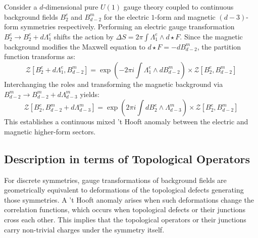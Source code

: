 \documentclass[aps,preprint,nofootinbib,preprintnumbers,eqsecnum,superscriptaddress]{revtex4}
\numberwithin{equation}{section}
\begin{document}
\begin{tcolorbox}[colback=green!5!white, colframe=green!75!black, title={Example: Maxwell Theory}]
    Consider a $d$-dimensional pure $U(1)$ gauge theory coupled to continuous background fields $B_2^e$ and $B_{d-2}^m$ for the electric $1$-form and magnetic $(d-3)$-form symmetries respectively. Performing an electric gauge transformation $B_2^e \to B_2^e + d\Lambda_1^e$ shifts the action by $\Delta S = 2\pi \int \Lambda_1^e \wedge d\star F$. Since the magnetic background modifies the Maxwell equation to $d\star F = -dB_{d-2}^m$, the partition function transforms as:
\begin{equation}
    \mathcal{Z}[B_2^e + d\Lambda_1^e, B_{d-2}^m] = \exp\left(-2\pi i \int \Lambda_1^e \wedge dB_{d-2}^m\right) \times \mathcal{Z}[B_2^e, B_{d-2}^m]
\end{equation}
Interchanging the roles and transforming the magnetic background via $B_{d-2}^m \to B_{d-2}^m + d\Lambda_{d-3}^m$ yields:
\begin{equation}
    \mathcal{Z}[B_2^e, B_{d-2}^m + d\Lambda_{d-3}^m] = \exp\left(2\pi i \int dB_2^e \wedge \Lambda_{d-3}^m\right) \times \mathcal{Z}[B_2^e, B_{d-2}^m]
\end{equation}
This establishes a continuous mixed 't Hooft anomaly between the electric and magnetic higher-form sectors.
\end{tcolorbox}


\subsection{Description in terms of Topological Operators}
For discrete symmetries, gauge transformations of background fields are geometrically equivalent to deformations of the topological defects generating those symmetries. A 't Hooft anomaly arises when such deformations change the correlation functions, which occurs when topological defects or their junctions cross each other. This implies that the topological operators or their junctions carry non-trivial charges under the symmetry itself.
\end{document}

